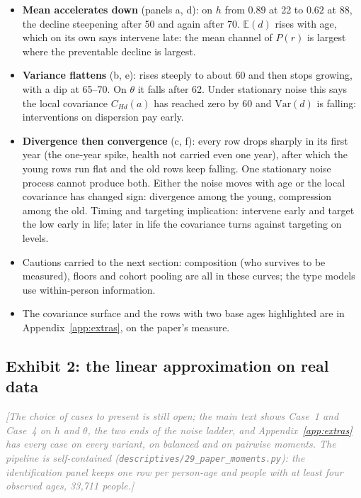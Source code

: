 \documentclass[11pt]{article}
\newcommand{\E}{\mathbb{E}}
\newcommand{\Var}{\mathrm{Var}}
\newcommand{\note}[1]{\textcolor{gray}{\textit{[#1]}}}
\newcommand{\code}[1]{\texttt{\small #1}}
\begin{document}
\begin{itemize}
\item \textbf{Mean accelerates down} (panels a, d): on $h$ from $0.89$ at 22 to $0.62$ at 88, the decline steepening after 50 and again after 70. $\E(d)$ rises with age, which on its own says intervene late: the mean channel of $P(r)$ is largest where the preventable decline is largest.
\item \textbf{Variance flattens} (b, e): rises steeply to about 60 and then stops growing, with a dip at 65--70. On $\theta$ it falls after 62. Under stationary noise this says the local covariance $C_{Hd}(a)$ has reached zero by 60 and $\Var(d)$ is falling: interventions on dispersion pay early.
\item \textbf{Divergence then convergence} (c, f): every row drops sharply in its first year (the one-year spike, health not carried even one year), after which the young rows run flat and the old rows keep falling. One stationary noise process cannot produce both. Either the noise moves with age or the local covariance has changed sign: divergence among the young, compression among the old. Timing and targeting implication: intervene early and target the low early in life; later in life the covariance turns against targeting on levels.
\item Cautions carried to the next section: composition (who survives to be measured), floors and cohort pooling are all in these curves; the type models use within-person information.
\item The covariance surface and the rows with two base ages highlighted are in Appendix~\ref{app:extras}, on the paper's measure.
\end{itemize}

\subsection{Exhibit 2: the linear approximation on real data}

\note{The choice of cases to present is still open; the main text shows Case~1 and Case~4 on $h$ and $\theta$, the two ends of the noise ladder, and Appendix~\ref{app:extras} has every case on every variant, on balanced and on pairwise moments. The pipeline is self-contained (\code{descriptives/29\_paper\_moments.py}): the identification panel keeps one row per person-age and people with at least four observed ages, 33,711 people.}
\end{document}

